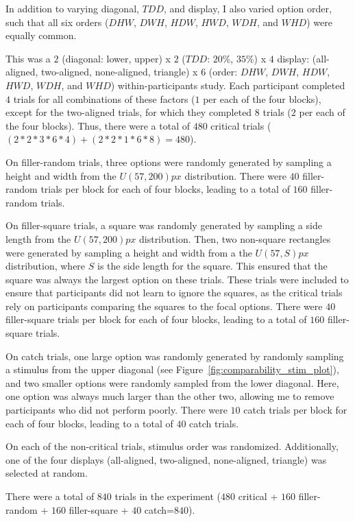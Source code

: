In addition to varying diagonal, $TDD$, and display, I also varied option order, such that all six orders ($DHW$, $DWH$, $HDW$, $HWD$, $WDH$, and $WHD$) were equally common.

This was a $2$ (diagonal: lower, upper) x $2$ ($TDD$: $20\%$, $35\%$) x $4$ display: (all-aligned, two-aligned, none-aligned, triangle) x $6$ (order: $DHW$, $DWH$, $HDW$, $HWD$, $WDH$, and $WHD$) within-participants study. Each participant completed $4$ trials for all combinations of these factors ($1$ per each of the four blocks), except for the two-aligned trials, for which they completed $8$ trials ($2$ per each of the four blocks). Thus, there were a total of $480$ critical trials ($(2*2*3*6*4)+ (2*2*1*6*8)=480$).

On filler-random trials, three options were randomly generated by sampling a height and width from the $U(57,200)px$ distribution. There were $40$ filler-random trials per block for each of four blocks, leading to a total of $160$ filler-random trials. 

On filler-square trials, a square was randomly generated by sampling a side length from the $U(57,200)px$ distribution. Then, two non-square rectangles were generated by sampling a height and width from a the $U(57,S)px$ distribution, where $S$ is the side length for the square. This ensured that the square was always the largest option on these trials. These trials were included to ensure that participants did not learn to ignore the squares, as the critical trials rely on participants comparing the squares to the focal options. There were $40$ filler-square trials per block for each of four blocks, leading to a total of $160$ filler-square trials.

On catch trials, one large option was randomly generated by randomly sampling a stimulus from the upper diagonal (see Figure~\ref{fig:comparability_stim_plot}), and two smaller options were randomly sampled from the lower diagonal. Here, one option was always much larger than the other two, allowing me to remove participants who did not perform poorly. There were $10$ catch trials per block for each of four blocks, leading to a total of $40$ catch trials.

On each of the non-critical trials, stimulus order was randomized. Additionally, one of the four displays (all-aligned, two-aligned, none-aligned, triangle) was selected at random.

There were a total of $840$ trials in the experiment ($480$ critical + $160$ filler-random + $160$ filler-square + $40$ catch=$840$).

